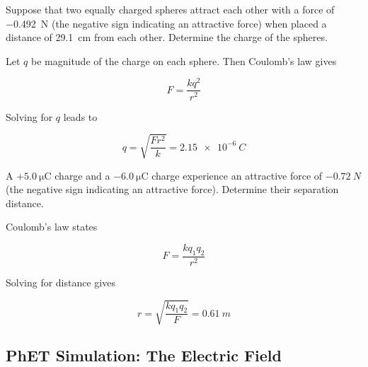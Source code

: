 \documentclass[]{exam}
\begin{document}
\begin{questions}
\question
Suppose that two equally charged spheres attract each other with a force of \SI{-0.492}{N} (the negative sign indicating an attractive force) when placed a distance of \SI{29.1}{cm} from each other. Determine the charge of the spheres. 

\begin{solution}
Let $q$ be magnitude of the charge on each sphere. Then Coulomb's law gives

\begin{equation*}
    F = \frac{kq^2}{r^2}
\end{equation*}

Solving for $q$ leads to 

\begin{equation*}
    q = \sqrt{\frac{Fr^2}{k}} = \boxed{\SI{2.15e-6}{C}}
\end{equation*}
\end{solution}

\question
A $+\SI{5.0}{\micro\coulomb}$ charge and a $-\SI{6.0}{\micro\coulomb}$ charge experience an attractive force of $-\SI{0.72}{N}$ (the negative sign indicating an attractive force). Determine their separation distance.

\begin{solution}
Coulomb's law states

\begin{equation*}
    F = \frac{kq_1q_2}{r^2}
\end{equation*}

Solving for distance gives

\begin{equation*}
    r = \sqrt{\frac{kq_1q_2}{F}} = \boxed{\SI{0.61}{m}}
\end{equation*}
\end{solution}
\end{questions}

\clearpage

\subsection*{PhET Simulation: The Electric Field}
\end{document}
